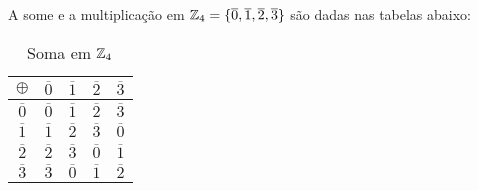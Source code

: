 \documentclass{beamer}
\begin{document}
    \begin{frame}
        \begin{exemplo}
            A some e a multiplica{\c c}{\~a}o em $\mathbb{Z}_4 = \{\overline{0},\overline{1},\overline{2},\overline{3}\}$
            s\~ao dadas nas tabelas abaixo:
                \begin{table}[!htb]
                  \caption{Soma em $\mathbb{Z}_4$}
                  \begin{minipage}{.5\linewidth}
                    \centering
                    \begin{tabular}{|c|c|c|c|c|} 
                        \hline
                        $\oplus$ & $\overline{0}$ & $\overline{1}$ & $\overline{2}$ & $\overline{3}$\T\\
                        \hline
                        $\overline{0}$ & $\overline{0}$ & $\overline{1}$ & $\overline{2}$ & $\overline{3}$\T\\
                        \hline
                        $\overline{1}$ & $\overline{1}$ & $\overline{2}$ & $\overline{3}$ & $\overline{0}$\T\\
                        \hline
                        $\overline{2}$ & $\overline{2}$ & $\overline{3}$ & $\overline{0}$ & $\overline{1}$\T\\
                        \hline
                        $\overline{3}$ & $\overline{3}$ & $\overline{0}$ & $\overline{1}$ & $\overline{2}$\T\\
                        \hline
                    \end{tabular}
                  \end{minipage}
                \end{table}
        \end{exemplo}
    \end{frame}
\end{document}
